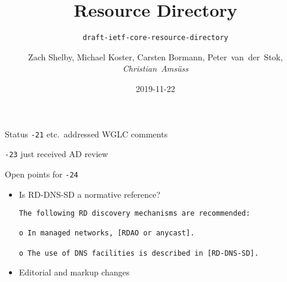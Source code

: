 \documentclass[aspectratio=169]{beamer}
\title{Resource Directory}
\subtitle{\texttt{draft-ietf-core-resource-directory}}
\author{Zach Shelby, Michael Koster, Carsten Bormann, Peter~van~der~Stok, \textit{Christian~Amsüss}}
\date{2019-11-22}
\begin{document}
\frame{\titlepage}

\begin{frame}{Status}\Large
	\texttt{-21} etc.\ addressed WGLC comments

	\bigskip

	\texttt{-23} just received AD review
\end{frame}

\begin{frame}[fragile]{Open points for \texttt{-24}}\Large
	\begin{itemize}
		\item Is RD-DNS-SD a normative reference?

			\bigskip

			\large

			\begin{verbatim}
The following RD discovery mechanisms are recommended:

o In managed networks, [RDAO or anycast].

o The use of DNS facilities is described in [RD-DNS-SD].
			\end{verbatim}

			\bigskip

		\item Editorial and markup changes
	\end{itemize}
\end{frame}
\end{document}
